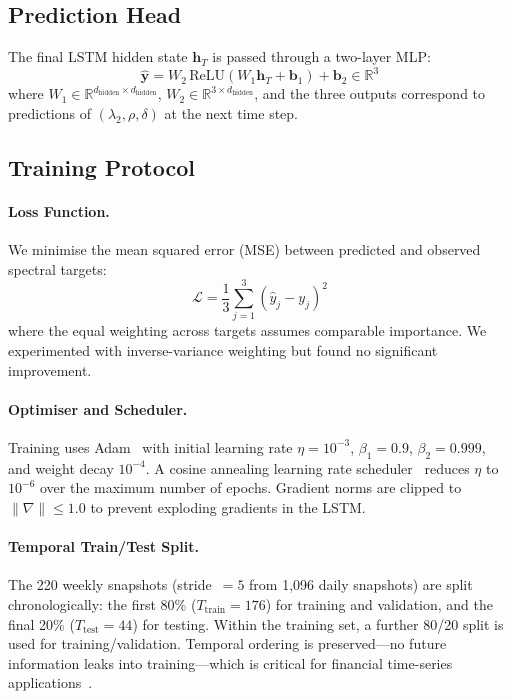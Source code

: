\subsection{Prediction Head}

The final LSTM hidden state $\mathbf{h}_T$ is passed through a two-layer MLP:
\begin{equation}
    \hat{\mathbf{y}} = W_2 \,\mathrm{ReLU}(W_1 \mathbf{h}_T + \mathbf{b}_1) + \mathbf{b}_2 \in \mathbb{R}^{3}
    \label{eq:mlp-head}
\end{equation}
where $W_1 \in \mathbb{R}^{d_{\text{hidden}} \times d_{\text{hidden}}}$, $W_2 \in \mathbb{R}^{3 \times d_{\text{hidden}}}$, and the three outputs correspond to predictions of $(\lambda_2, \rho, \delta)$ at the next time step.

\subsection{Training Protocol}

\paragraph{Loss Function.}
We minimise the mean squared error (MSE) between predicted and observed spectral targets:
\begin{equation}
    \mathcal{L} = \frac{1}{3}\sum_{j=1}^{3}\left(\hat{y}_j - y_j\right)^2
    \label{eq:mse-loss}
\end{equation}
where the equal weighting across targets assumes comparable importance. We experimented with inverse-variance weighting but found no significant improvement.

\paragraph{Optimiser and Scheduler.}
Training uses Adam~\cite{goodfellow2016deep} with initial learning rate $\eta = 10^{-3}$, $\beta_1 = 0.9$, $\beta_2 = 0.999$, and weight decay $10^{-4}$. A cosine annealing learning rate scheduler~\cite{goodfellow2016deep} reduces $\eta$ to $10^{-6}$ over the maximum number of epochs. Gradient norms are clipped to $\|\nabla\| \leq 1.0$ to prevent exploding gradients in the LSTM.

\paragraph{Temporal Train/Test Split.}
The 220 weekly snapshots (stride~$=5$ from 1,096 daily snapshots) are split chronologically: the first 80\% ($T_{\text{train}} = 176$) for training and validation, and the final 20\% ($T_{\text{test}} = 44$) for testing. Within the training set, a further 80/20 split is used for training/validation. Temporal ordering is preserved---no future information leaks into training---which is critical for financial time-series applications~\cite{mantegna1999introduction}.

